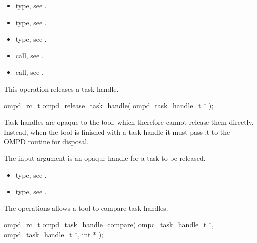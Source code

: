 \crossreferences
\begin{itemize}
  \item {} type, see .
	\item {} type, see .
	\item {} type, see .
	\item {} call, see .
	\item {} call, see .
\end{itemize}

\label{subsubsubsec:ompd_release_task_handle}
\summary
This operation releases a task handle.

\format

\begin{cspecific}
\begin{ompSyntax}
ompd_rc_t ompd_release_task_handle(
  ompd_task_handle_t *
);
\end{ompSyntax}
\end{cspecific}


\descr
Task handles are opaque to the tool, which therefore cannot release
them directly. Instead, when the tool is finished with a task handle it must
pass it to the OMPD  routine
for disposal.

\argdesc
The input argument  is an opaque handle for a task
to be released.

\crossreferences
\begin{itemize}
  \item {} type, see .
	\item {} type, see .
\end{itemize}


\label{subsubsubsec:ompd_task_handle_compare}
\summary
The  operations allows a tool to compare task
handles.

\format

\begin{cspecific}
\begin{ompSyntax}
ompd_rc_t ompd_task_handle_compare(
  ompd_task_handle_t *,
  ompd_task_handle_t *,
  int *
);
\end{ompSyntax}
\end{cspecific}


